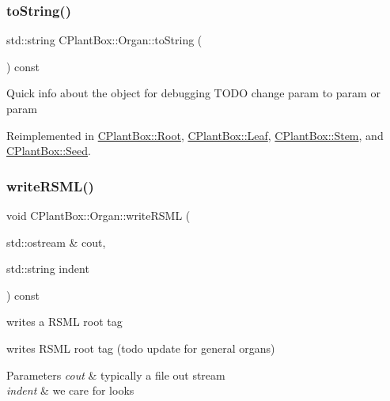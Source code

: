 \subsubsection{\texorpdfstring{to\+String()}{toString()}}
{\footnotesize\ttfamily std\+::string C\+Plant\+Box\+::\+Organ\+::to\+String (\begin{DoxyParamCaption}{ }\end{DoxyParamCaption}) const\hspace{0.3cm}{\ttfamily [virtual]}}

Quick info about the object for debugging T\+O\+DO change param to param or param 

Reimplemented in \hyperlink{classCPlantBox_1_1Root_a389312a40582e21c1eaa6c5ebb927f2e}{C\+Plant\+Box\+::\+Root}, \hyperlink{classCPlantBox_1_1Leaf_a7c09270825fa8f874dcf409969dbb554}{C\+Plant\+Box\+::\+Leaf}, \hyperlink{classCPlantBox_1_1Stem_a08ed9dc10ef3ea13c90bc326e6cc989b}{C\+Plant\+Box\+::\+Stem}, and \hyperlink{classCPlantBox_1_1Seed_a83a1493777594b1e92d31d6d3db4258b}{C\+Plant\+Box\+::\+Seed}.

\mbox{\label{classCPlantBox_1_1Organ_acdad546c90e915b61ac3606f1f841ba1}} 
\subsubsection{\texorpdfstring{write\+R\+S\+M\+L()}{writeRSML()}}
{\footnotesize\ttfamily void C\+Plant\+Box\+::\+Organ\+::write\+R\+S\+ML (\begin{DoxyParamCaption}\item[{std\+::ostream \&}]{cout,  }\item[{std\+::string}]{indent }\end{DoxyParamCaption}) const\hspace{0.3cm}{\ttfamily [virtual]}}



writes a R\+S\+ML root tag 

writes R\+S\+ML root tag (todo update for general organs)


\begin{DoxyParams}{Parameters}
{\em cout} & typically a file out stream \\
\hline
{\em indent} & we care for looks \\
\hline
\end{DoxyParams}


